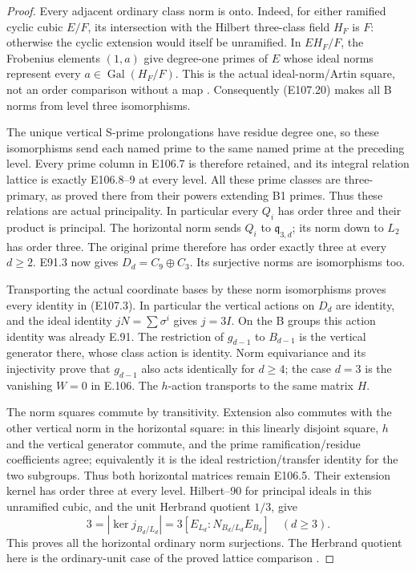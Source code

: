 \begin{proof}
Every adjacent ordinary class norm is onto. Indeed, for either
ramified cyclic cubic \(E/F\), its intersection with the Hilbert
three-class field \(H_F\) is \(F\): otherwise the cyclic extension
would itself be unramified. In \(EH_F/F\), the Frobenius elements
\((1,a)\) give degree-one primes of \(E\) whose ideal norms
represent every \(a\in\operatorname{Gal}(H_F/F)\).
This is the actual ideal-norm/Artin square, not an order comparison
without a map
\cite[V,Proposition3.3,Theorem3.6,Example3.9;
VIII,Theorem7.4]{E_MilneCFT}.
Consequently (E107.20) makes all B norms from level three
isomorphisms.

The unique vertical S-prime prolongations have residue degree one,
so these isomorphisms send each named prime to the same named
prime at the preceding level. Every prime column in E106.7 is
therefore retained, and its integral relation lattice is exactly
E106.8--9 at every level. All these prime classes are three-primary,
as proved there from their powers extending B1 primes.
Thus these relations are actual principality. In particular every
\(Q_i\) has order three and their product is principal.
The horizontal norm sends \(Q_i\) to \(\mathfrak q_{3,d}\);
its norm down to \(L_2\) has order three. The original prime
therefore has order exactly three at every \(d\ge2\).
E91.3 now gives \(D_d=C_9\oplus C_3\). Its surjective norms
are isomorphisms too.

Transporting the actual coordinate bases by these norm
isomorphisms proves every identity in (E107.3).
In particular the vertical actions on \(D_d\) are identity,
and the ideal identity \(jN=\sum\sigma^i\) gives \(j=3I\).
On the B groups this action identity was already E.91.
The restriction of \(g_{d-1}\) to \(B_{d-1}\) is the vertical
generator there, whose class action is identity. Norm equivariance
and its injectivity prove that \(g_{d-1}\) also acts identically
for \(d\ge4\); the case \(d=3\) is the vanishing \(W=0\) in E.106.
The \(h\)-action transports to the same matrix \(H\).

The norm squares commute by transitivity. Extension also commutes
with the other vertical norm in the horizontal square: in this
linearly disjoint square, \(h\) and the vertical generator commute,
and the prime ramification/residue coefficients agree; equivalently
it is the ideal restriction/transfer identity for the two subgroups.
Thus both horizontal matrices remain E106.5. Their extension
kernel has order three at every level. Hilbert--90 for principal
ideals in this unramified cubic, and the unit Herbrand quotient
\(1/3\), give
\[
 3=|\ker j_{B_d/L_d}|
   =3[E_{L_d}:N_{B_d/L_d}E_{B_d}]\quad(d\ge3).
 \tag{E107.21}
\]
This proves all the horizontal ordinary norm surjections.
The Herbrand quotient here is the ordinary-unit case of the
proved lattice comparison
\cite[VII,Proposition3.1 and its complete proof]{E_MilneCFT}.


\end{proof}
